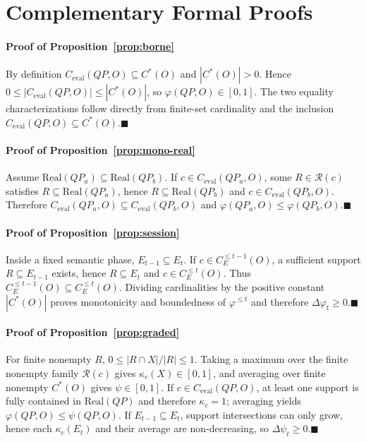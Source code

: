 \section{Complementary Formal Proofs}
\label{app:formal-proofs}

\paragraph*{Proof of Proposition~\ref{prop:borne}}
By definition $C_{\mathrm{eval}}(QP,O)\subseteq C^*(O)$ and $|C^*(O)|>0$. Hence $0\le |C_{\mathrm{eval}}(QP,O)|\le |C^*(O)|$, so $\varphi(QP,O)\in[0,1]$. The two equality characterizations follow directly from finite-set cardinality and the inclusion $C_{\mathrm{eval}}(QP,O)\subseteq C^*(O)$.\unskip\nobreak\hspace{0.5em}$\blacksquare$

\paragraph*{Proof of Proposition~\ref{prop:mono-real}}
Assume $\mathrm{Real}(QP_a)\subseteq\mathrm{Real}(QP_b)$. If $c\in C_{\mathrm{eval}}(QP_a,O)$, some $R\in\mathcal R(c)$ satisfies $R\subseteq\mathrm{Real}(QP_a)$, hence $R\subseteq\mathrm{Real}(QP_b)$ and $c\in C_{\mathrm{eval}}(QP_b,O)$. Therefore $C_{\mathrm{eval}}(QP_a,O)\subseteq C_{\mathrm{eval}}(QP_b,O)$ and $\varphi(QP_a,O)\le\varphi(QP_b,O)$.\unskip\nobreak\hspace{0.5em}$\blacksquare$

\paragraph*{Proof of Proposition~\ref{prop:session}}
Inside a fixed semantic phase, $E_{t-1}\subseteq E_t$. If $c\in C_E^{\le t-1}(O)$, a sufficient support $R\subseteq E_{t-1}$ exists, hence $R\subseteq E_t$ and $c\in C_E^{\le t}(O)$. Thus $C_E^{\le t-1}(O)\subseteq C_E^{\le t}(O)$. Dividing cardinalities by the positive constant $|C^*(O)|$ proves monotonicity and boundedness of $\varphi^{\le t}$ and therefore $\Delta\varphi_t\ge0$.\unskip\nobreak\hspace{0.5em}$\blacksquare$

\paragraph*{Proof of Proposition~\ref{prop:graded}}
For finite nonempty $R$, $0\le |R\cap X|/|R|\le1$. Taking a maximum over the finite nonempty family $\mathcal R(c)$ gives $\kappa_c(X)\in[0,1]$, and averaging over finite nonempty $C^*(O)$ gives $\psi\in[0,1]$. If $c\in C_{\mathrm{eval}}(QP,O)$, at least one support is fully contained in $\mathrm{Real}(QP)$ and therefore $\kappa_c=1$; averaging yields $\varphi(QP,O)\le\psi(QP,O)$. If $E_{t-1}\subseteq E_t$, support intersections can only grow, hence each $\kappa_c(E_t)$ and their average are non-decreasing, so $\Delta\psi_t\ge0$.\unskip\nobreak\hspace{0.5em}$\blacksquare$

